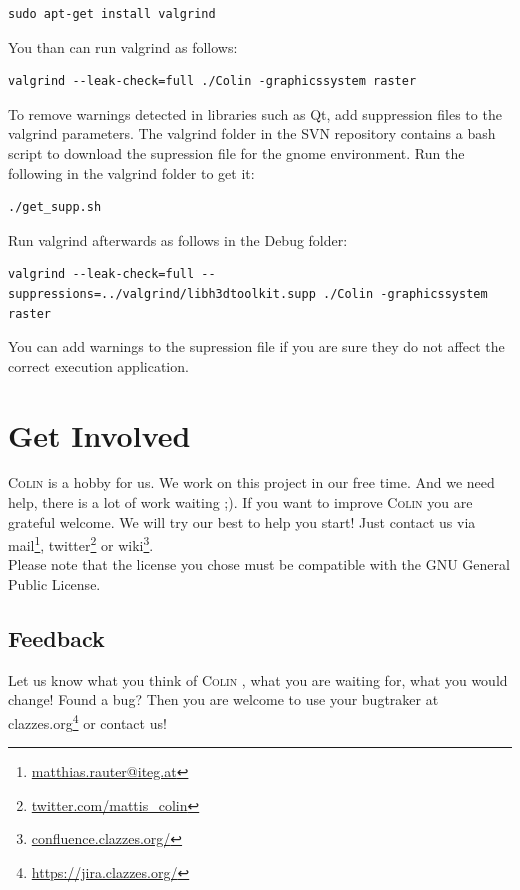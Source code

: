 \documentclass[a4paper,11pt]{report}
\newcommand{\Colin}[0]{\textsc{Colin }}
\begin{document}
\begin{lstlisting}[frame=single, breaklines=true, basicstyle=\small]
sudo apt-get install valgrind
\end{lstlisting}

You than can run valgrind as follows:
\begin{lstlisting}[frame=single, breaklines=true, basicstyle=\small]
valgrind --leak-check=full ./Colin -graphicssystem raster
\end{lstlisting}

To remove warnings detected in libraries such as Qt, add suppression files to the valgrind parameters. The valgrind folder in the SVN repository contains a bash script to download the supression file for the gnome environment. Run the following in the valgrind folder to get it:
\begin{lstlisting}[frame=single, breaklines=true, basicstyle=\small]
./get_supp.sh
\end{lstlisting}

Run valgrind afterwards as follows in the Debug folder:
\begin{lstlisting}[frame=single, breaklines=true, basicstyle=\small]
valgrind --leak-check=full --suppressions=../valgrind/libh3dtoolkit.supp ./Colin -graphicssystem raster
\end{lstlisting}

You can add warnings to the supression file if you are sure they do not affect the correct execution application.



\chapter{Get Involved}
\label{cha:involved}

\Colin is a hobby for us. We work on this project in our free time. And we need help, there is a lot of work waiting ;). If you want to improve \Colin you are grateful welcome. We will try our best to help you start! Just contact us via mail\footnote{\href{mailto:matthias.rauter@iteg.at}{matthias.rauter@iteg.at}}, twitter\footnote{\url{twitter.com/mattis_colin}} or wiki\footnote{\url{confluence.clazzes.org/}}.\\
Please note that the license you chose must be compatible with the GNU General Public License.


\section{Feedback}
Let us know what you think of \Colin, what you are waiting for, what you would change! Found a bug?
Then you are welcome to use your bugtraker at clazzes.org\footnote{\url{https://jira.clazzes.org/}} or contact us!
\end{document}
